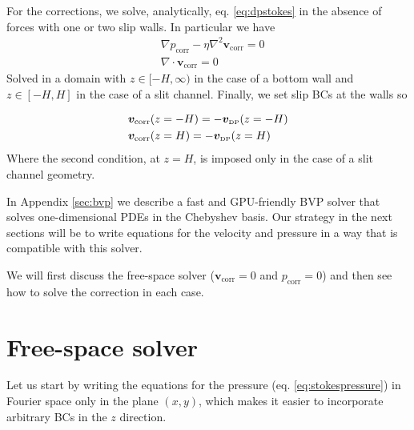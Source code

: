 \documentclass[ twoside,openright,titlepage,numbers=noenddot,%
headinclude,footinclude,cleardoublepage=empty,abstract=on,
BCOR=5mm,paper=a4,fontsize=11pt, dvipsnames
]{scrreprt}
\renewcommand{\vec}[1]{\bm{#1}}
\newcommand{\gpu}{\gls{GPU}\xspace}
\newcommand{\fvel}{v}
\newcommand{\corr}{\text{corr}}
\newcommand{\dpr}{\text{\tiny DP}}
\begin{document}
For the corrections, we solve, analytically, eq. \eqref{eq:dpstokes} in the absence of forces with one or two slip walls. In particular we have
\begin{equation}
  \label{eq:dpstokescorr}
\begin{aligned}
    &\nabla p_{\corr} - \eta\nabla^2\vec{\fvel}_{\corr} = 0\\
    &\nabla\cdot\vec{\fvel}_{\corr} = 0  
\end{aligned}
\end{equation}
Solved in a domain with $z\in [-H,\infty)$ in the case of a bottom wall and $z\in [-H, H]$ in the case of a slit channel. Finally, we set slip \glspl{BC} at the walls so

\begin{equation}
  \label{eq:dpstokescorrbcs}
  \begin{aligned}
    &\vec{\fvel}_{\corr}(z=-H) = -\vec{\fvel}_{\dpr}(z=-H)\\
    &\vec{\fvel}_{\corr}(z=H) = -\vec{\fvel}_{\dpr}(z=H)    
\end{aligned}
\end{equation}
Where the second condition, at $z=H$, is imposed only in the case of a slit channel geometry.

In Appendix \ref{sec:bvp} we describe a fast and \gpu-friendly \gls{BVP} solver that solves one-dimensional \glspl{PDE} in the Chebyshev basis. Our strategy in the next sections will be to write equations for the velocity and pressure in a way that is compatible with this solver.

We will first discuss the free-space solver ($\vec{\fvel}_{\corr} = 0$ and $p_\corr=0$) and then see how to solve the correction in each case. 
\section{Free-space solver}
Let us start by writing the equations for the pressure (eq. \eqref{eq:stokespressure}) in Fourier space only in the plane $(x,y)$, which makes it easier to incorporate arbitrary \glspl{BC} in the $z$ direction.
\end{document}
